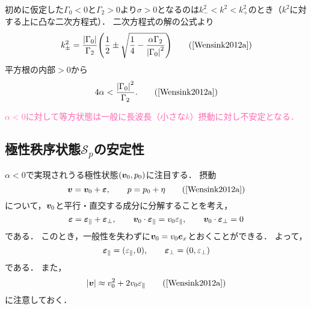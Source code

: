 \documentclass[12pt,dvipdfmx,svgnames,a4paper,uplatex]{ujarticle}
\theoremstyle{plain}
\begin{document}
初めに仮定した\(\Gamma_0 < 0\)と\(\Gamma_2 > 0\)より\(\sigma > 0\)となるのは\(k_-^2 < k^2 < k_+^2\)のとき（\(k^2\)に対する上に凸な二次方程式）．
二次方程式の解の公式より
\begin{equation}
  k_{\pm}^2 = \frac{\abs{\Gamma_0}}{\Gamma_2} \qty( \frac{1}{2} \pm \sqrt{ \frac{1}{4} - \frac{\alpha \Gamma_2}{\abs{\Gamma_0}^2} } )
  \label{eq:k_pm}
  \tag{\cite[Eq. 31]{Wensink2012a}}
\end{equation}
平方根の内部\(>0\)から
\begin{equation}
  4\alpha < \frac{\abs{\Gamma_0}^2}{\Gamma_2}.
  \label{eq:alpha_condition}
  \tag{\cite[Eq. 32]{Wensink2012a}}
\end{equation}

\textcolor{HotPink}{\(\alpha < 0\)に対して等方状態は一般に長波長（小さな\(k\)）摂動に対し不安定となる．}


\subsection{極性秩序状態\(\mathcal{S}_p\)の安定性}
\label{subsec:stability_of_the_ordered_polar_state}

\(\alpha < 0\)で実現されうる極性状態\((\vb*{v}_0, p_0)\)に注目する．
摂動
\begin{equation}
  \vb*{v} = \vb*{v}_0 + \vb*{\varepsilon}, \qquad p = p_0 + \eta
  \tag{\cite[Eq. 33]{Wensink2012a}}
\end{equation}
について，\(\vb*{v}_0\)と平行・直交する成分に分解することを考え，
\begin{equation*}
  \vb*{\varepsilon} = \vb*{\varepsilon}_\parallel + \vb*{\varepsilon}_\bot, \qquad \vb*{v}_0 \cdot \vb*{\varepsilon}_\parallel = v_0 \varepsilon_\parallel, \qquad \vb*{v}_0 \cdot \vb*{\varepsilon}_\bot = 0
\end{equation*}
である．
このとき，一般性を失わずに\(\vb*{v}_0 = v_0 \vb*{e}_x\)とおくことができる．
よって，
\begin{equation*}
  \vb*{\varepsilon}_\parallel = (\varepsilon_\parallel, 0), \qquad \vb*{\varepsilon}_\bot = (0, \varepsilon_\bot)
\end{equation*}
である．
また，
\begin{equation}
  \abs{\vb*{v}} \approx v_0^2 + 2 v_0 \varepsilon_\parallel
  \label{eq:v_squared_approximation}
  \tag{\cite[Eq. 34]{Wensink2012a}}
\end{equation}
に注意しておく．
\end{document}
